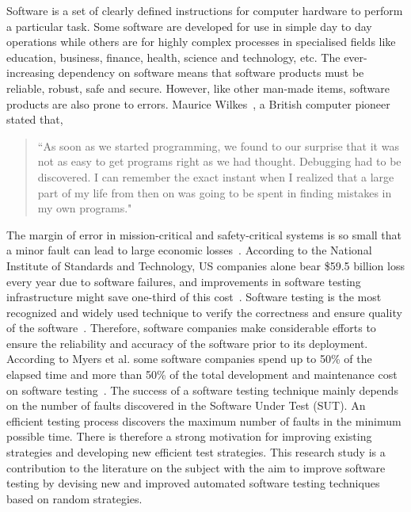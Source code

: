 Software is a set of clearly defined instructions for computer hardware to perform a particular task. Some software are developed for use in simple day to day operations while others are for highly complex processes in specialised fields like education, business, finance, health, science and technology, etc. The ever-increasing dependency on software means that software products must be reliable, robust, safe and secure. However, like other man-made items, software products are also prone to errors. Maurice Wilkes~\cite{wilkes1985memoirs}, a British computer pioneer stated that,
\smallskip
\begin{quote}
``As soon as we started programming, we found to our surprise that it was not as easy to get programs right as we had thought. Debugging had to be discovered. I can remember the exact instant when I realized that a large part of my life from then on was going to be spent in finding mistakes in my own programs."
\end{quote}
\bigskip
The margin of error in mission-critical and safety-critical systems is so small that a minor fault can lead to large economic losses~\cite{huang2004securing}. According to the National Institute of Standards and Technology, US companies alone bear \$59.5 billion loss every year due to software failures, and improvements in software testing infrastructure might save one-third of this cost~\cite{tassey2002economic}. Software testing is the most recognized and widely used technique to verify the correctness and ensure quality of the software~\cite{patton2001software}. Therefore, software companies make considerable efforts to ensure the reliability and accuracy of the software prior to its deployment. According to Myers et al. some software companies spend up to 50\% of the elapsed time and more than 50\% of the total development and maintenance cost on software testing~\cite{myers2011art}. The success of a software testing technique mainly depends on the number of faults discovered in the Software Under Test (SUT). An efficient testing process discovers the maximum number of faults in the minimum possible time. There is therefore a strong motivation for improving existing strategies and developing new efficient test strategies. This research study is a contribution to the literature on the subject with the aim to improve software testing by devising new and improved automated software testing techniques based on random strategies.

